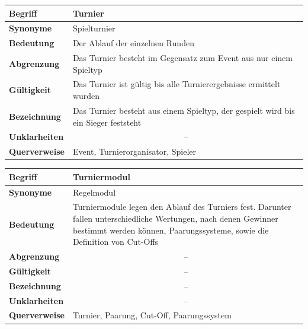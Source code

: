 \documentclass[11pt]{article}
\begin{document}
\begin{tabularx}{\textwidth}{| p{} | p{} |}
	\hline
	\textbf{Begriff} & Turnier\\
	\hline
	\textbf{Synonyme} & Spielturnier \\
	\hline
	\textbf{Bedeutung} & Der Ablauf der einzelnen Runden\\
	\hline
	\textbf{Abgrenzung} & Das Turnier besteht im Gegensatz zum Event aus nur einem Spieltyp\\
	\hline
	\textbf{Gültigkeit} & Das Turnier ist gültig bis alle Turnierergebnisse ermittelt wurden\\
	\hline
	\textbf{Bezeichnung} & Das Turnier besteht aus einem Spieltyp, der gespielt wird bis ein Sieger feststeht\\
	\hline
	\textbf{Unklarheiten} & \multicolumn{1}{c|}{--} \\
	\hline
	\textbf{Querverweise} & Event, Turnierorganisator, Spieler \\
	\hline
\end{tabularx}

\newpage

\begin{tabularx}{\textwidth}{| p{} | p{} |}
	\hline
	\textbf{Begriff} & Turniermodul\\
	\hline
	\textbf{Synonyme} & Regelmodul\\
	\hline
	\textbf{Bedeutung} & Turniermodule legen den Ablauf des Turniers fest. Darunter fallen unterschiedliche Wertungen, nach denen Gewinner bestimmt werden können, Paarungssysteme, sowie die Definition von Cut-Offs\\
	\hline
	\textbf{Abgrenzung} & \multicolumn{1}{c|}{--} \\
	\hline
	\textbf{Gültigkeit} & \multicolumn{1}{c|}{--} \\
	\hline
	\textbf{Bezeichnung} & \multicolumn{1}{c|}{--} \\
	\hline
	\textbf{Unklarheiten} & \multicolumn{1}{c|}{--} \\
	\hline
	\textbf{Querverweise} & Turnier, Paarung, Cut-Off, Paarungssystem\\
	\hline
\end{tabularx}
\end{document}

